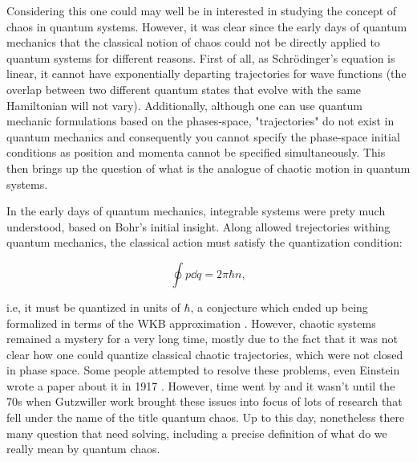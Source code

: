 \documentclass[11pt,a4paper]{article}
\begin{document}
Considering this one could may well be in interested in studying the concept of chaos in quantum systems. However, it was clear since the early days of quantum mechanics that the classical notion of chaos could not be directly applied to quantum systems for different reasons. First of all, as Schrödinger's equation is linear, it cannot have exponentially departing trajectories for wave functions (the overlap between two different quantum states that evolve with the same Hamiltonian will not vary). Additionally, although one can use quantum mechanic formulations based on the phases-space, "trajectories" do not exist in quantum mechanics and consequently you cannot specify the phase-space initial conditions as position and momenta cannot be specified simultaneously. This then brings up the question of what is the analogue of chaotic motion in quantum systems.

In the early days of quantum mechanics, integrable systems were prety much understood, based on Bohr's initial insight. Along allowed trejectories withing quantum mechanics, the classical action must satisfy the quantization condition:

\begin{equation}
    \oint p\dd q =2\pi\hbar n,
\end{equation}

i.e, it must be quantized in units of $\hbar$, a conjecture which ended up being formalized in terms of the WKB approximation \cite{wentzel_verallgemeinerung_1926,kramers_wellenmechanik_1926,Brillouin:1926blg}. However, chaotic systems remained a mystery for a very long time, mostly due to the fact that it was not clear how one could quantize classical chaotic trajectories, which were not closed in phase space. Some people attempted to resolve these problems, even Einstein wrote a paper about it in 1917 \cite{stone_einsteins_2005}. However, time went by and it wasn't until the 70s when Gutzwiller work \cite{gutzwiller_periodic_1971} brought these issues into focus of lots of research that fell under the name of the title quantum chaos. Up to this day, nonetheless there many question that need solving, including a precise definition of what do we really mean by quantum chaos.
\end{document}
